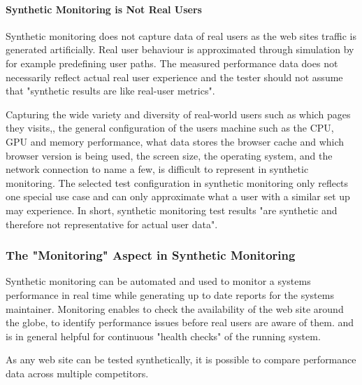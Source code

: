 \paragraph{Synthetic Monitoring is Not Real Users}

Synthetic monitoring does not capture data of real users as the web sites traffic is generated artificially.
Real user behaviour is approximated through simulation by for example predefining user paths.
The measured performance data does not necessarily reflect actual real user experience and the tester should not assume that "synthetic results are like real-user metrics". %

Capturing the wide variety and diversity of real-world users such as which pages they visits,, the general configuration of the users machine such as the CPU, GPU and memory performance, what data stores the browser cache and which browser version is being used, the screen size, the operating system, and the network connection to name a few, is difficult to represent in synthetic monitoring. %
The selected test configuration in synthetic monitoring only reflects one special use case and can only approximate what a user with a similar set up may experience. %
In short, synthetic monitoring test results "are synthetic and therefore not representative for actual user data".  %



\subsubsection{The "Monitoring" Aspect in Synthetic Monitoring}


Synthetic monitoring can be automated and used to monitor a systems performance in real time while generating up to date reports for the systems maintainer. %
Monitoring enables to check the availability of the web site around the globe, %
to identify performance issues before real users are aware of them. %
and is in general helpful for continuous "health checks" of the running system. %

As any web site can be tested synthetically, it is possible to compare performance data across multiple competitors. %



